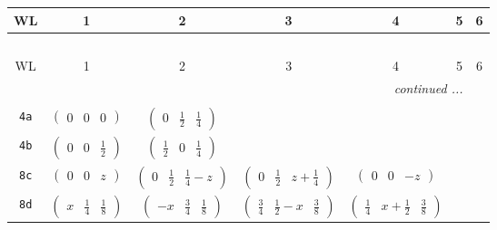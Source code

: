 \documentclass[fleqn,9pt,landscape]{jsarticle}
\begin{document}
\begin{center}
\renewcommand{\arraystretch}{1.2}
\begin{longtable}{ccccccc}
 \hline \hline
WL & 1 & 2 & 3 & 4 & 5 & 6 \\ \hline \endfirsthead

\multicolumn{6}{l}{\tablename\ \thetable{}} \\
 \hline \hline
WL & 1 & 2 & 3 & 4 & 5 & 6 \\ \hline \endhead

 \hline \hline
\multicolumn{6}{r}{\footnotesize\it continued ...} \\ \endfoot

 \hline \hline
\multicolumn{6}{r}{} \\ \endlastfoot

{\tt 4a} & $ \begin{pmatrix} 0 & 0 & 0 \end{pmatrix} $ & $ \begin{pmatrix} 0 & \frac{1}{2} & \frac{1}{4} \end{pmatrix} $ & $  $ & $  $ & $  $ & $  $ \\ \hline
{\tt 4b} & $ \begin{pmatrix} 0 & 0 & \frac{1}{2} \end{pmatrix} $ & $ \begin{pmatrix} \frac{1}{2} & 0 & \frac{1}{4} \end{pmatrix} $ & $  $ & $  $ & $  $ & $  $ \\ \hline
{\tt 8c} & $ \begin{pmatrix} 0 & 0 & z \end{pmatrix} $ & $ \begin{pmatrix} 0 & \frac{1}{2} & \frac{1}{4} - z \end{pmatrix} $ & $ \begin{pmatrix} 0 & \frac{1}{2} & z + \frac{1}{4} \end{pmatrix} $ & $ \begin{pmatrix} 0 & 0 & - z \end{pmatrix} $ & $  $ & $  $ \\ \hline
{\tt 8d} & $ \begin{pmatrix} x & \frac{1}{4} & \frac{1}{8} \end{pmatrix} $ & $ \begin{pmatrix} - x & \frac{3}{4} & \frac{1}{8} \end{pmatrix} $ & $ \begin{pmatrix} \frac{3}{4} & \frac{1}{2} - x & \frac{3}{8} \end{pmatrix} $ & $ \begin{pmatrix} \frac{1}{4} & x + \frac{1}{2} & \frac{3}{8} \end{pmatrix} $ & $  $ & $  $ \\ \hline

\end{longtable}
\end{center}
\end{document}
